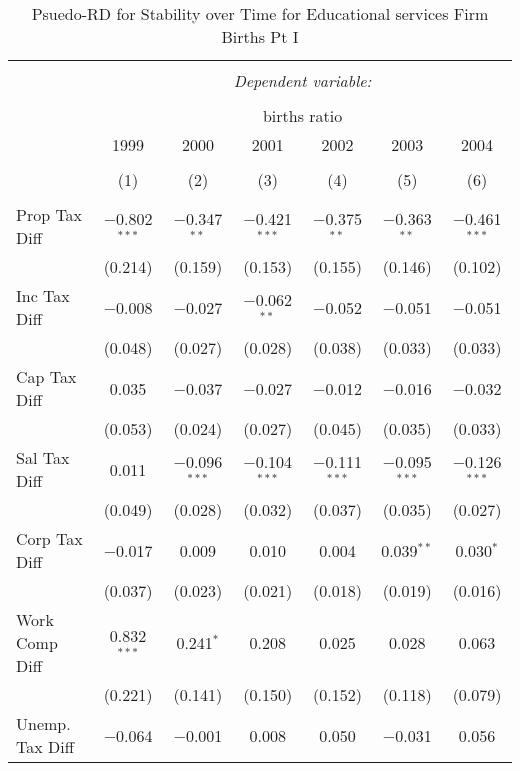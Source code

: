 
\begin{table}[!htbp] \centering 
  \caption{Psuedo-RD for Stability over Time for  Educational services Firm Births Pt I} 
  \label{61year} 
\small 
\begin{tabular}{@{\extracolsep{5pt}}lcccccc} 
\\[-1.8ex]\hline 
\hline \\[-1.8ex] 
 & \multicolumn{6}{c}{\textit{Dependent variable:}} \\ 
\cline{2-7} 
\\[-1.8ex] & \multicolumn{6}{c}{births ratio} \\ 
 & 1999 & 2000 & 2001 & 2002 & 2003 & 2004 \\ 
\\[-1.8ex] & (1) & (2) & (3) & (4) & (5) & (6)\\ 
\hline \\[-1.8ex] 
 Prop Tax Diff & $-$0.802$^{***}$ & $-$0.347$^{**}$ & $-$0.421$^{***}$ & $-$0.375$^{**}$ & $-$0.363$^{**}$ & $-$0.461$^{***}$ \\ 
  & (0.214) & (0.159) & (0.153) & (0.155) & (0.146) & (0.102) \\ 
  Inc Tax Diff & $-$0.008 & $-$0.027 & $-$0.062$^{**}$ & $-$0.052 & $-$0.051 & $-$0.051 \\ 
  & (0.048) & (0.027) & (0.028) & (0.038) & (0.033) & (0.033) \\ 
  Cap Tax Diff & 0.035 & $-$0.037 & $-$0.027 & $-$0.012 & $-$0.016 & $-$0.032 \\ 
  & (0.053) & (0.024) & (0.027) & (0.045) & (0.035) & (0.033) \\ 
  Sal Tax Diff & 0.011 & $-$0.096$^{***}$ & $-$0.104$^{***}$ & $-$0.111$^{***}$ & $-$0.095$^{***}$ & $-$0.126$^{***}$ \\ 
  & (0.049) & (0.028) & (0.032) & (0.037) & (0.035) & (0.027) \\ 
  Corp Tax Diff & $-$0.017 & 0.009 & 0.010 & 0.004 & 0.039$^{**}$ & 0.030$^{*}$ \\ 
  & (0.037) & (0.023) & (0.021) & (0.018) & (0.019) & (0.016) \\ 
  Work Comp Diff & 0.832$^{***}$ & 0.241$^{*}$ & 0.208 & 0.025 & 0.028 & 0.063 \\ 
  & (0.221) & (0.141) & (0.150) & (0.152) & (0.118) & (0.079) \\ 
  Unemp. Tax Diff & $-$0.064 & $-$0.001 & 0.008 & 0.050 & $-$0.031 & 0.056 \\ 

\end{tabular}
\end{table}
